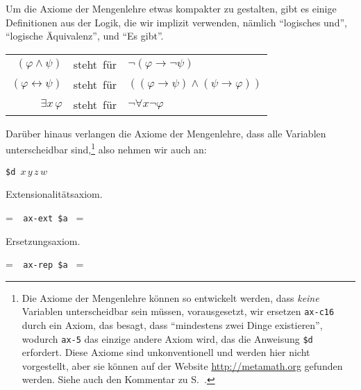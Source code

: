 Um die Axiome der Mengenlehre etwas kompakter zu gestalten, gibt es einige Definitionen aus der Logik, die wir implizit verwenden, nämlich "`logisches {\sc und}"',  "`logische Äquivalenz"', und "`Es gibt"'.

\begin{center}\begin{tabular}{rcl}
  $( \varphi \wedge \psi )$ &\mbox{steht für}& $\neg ( \varphi
     \rightarrow \neg \psi )$\\
  $( \varphi \leftrightarrow \psi )$& \mbox{steht für}& $( ( \varphi \rightarrow \psi ) \wedge
     ( \psi \rightarrow \varphi ) )$\\
  $\exists x \,\varphi$ &\mbox{steht für}& $\neg \forall x \neg \varphi$
\end{tabular}\end{center}

Darüber hinaus verlangen die Axiome der Mengenlehre, dass alle Variablen unterscheidbar sind,\footnote{Die Axiome der Mengenlehre können so entwickelt werden, dass {\em keine} Variablen unterscheidbar sein müssen, vorausgesetzt, wir ersetzen \texttt{ax-c16} durch ein Axiom, das besagt, dass "`mindestens zwei Dinge existieren"', wodurch \texttt{ax-5} das einzige andere Axiom wird, das die Anweisung \texttt{\$d} erfordert.  Diese Axiome sind unkonventionell und werden hier nicht vorgestellt, aber sie können auf der Website \url{http://metamath.org} gefunden werden.  Siehe auch den Kommentar zu S.~\pageref{nodd}.} also nehmen wir auch an:
\begin{center}
  \texttt{\$d }$x\,y\,z\,w$
\end{center}

\noindent Extensionalitätsaxiom.

\setbox\startprefix=\hbox{\tt \ \ ax-ext\ \$a\ }
\setbox\contprefix=\hbox{\tt \ \ \ \ \ \ \ \ \ \ \ \ }
\startm
\m{\vdash}\m{(}\m{\forall}\m{(}\m{\in}\m{\leftrightarrow}
\m{\in}\m{)}\m{\rightarrow}\m{=}\m{)}
\endm

\noindent Ersetzungsaxiom.

\setbox\startprefix=\hbox{\tt \ \ ax-rep\ \$a\ }
\setbox\contprefix=\hbox{\tt \ \ \ \ \ \ \ \ \ \ \ \ }
\startm
\m{\vdash}\m{(}\m{\forall}\m{\exists}\m{\forall}\m{(}\m{%
\forall}\m{\varphi}\m{\rightarrow}\m{=}\m{)}\m{\rightarrow}\m{%
\exists}\m{\forall}\m{(}\m{\in}\m{\leftrightarrow}\m{%
\exists}\m{(}\m{\in}\m{\wedge}\m{\forall}\m{\varphi}\m{)}%
\m{)}\m{)}
\endm

